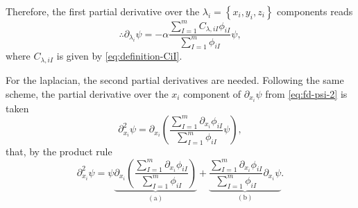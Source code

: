 Therefore, the first partial derivative over the 
$\lambda_i = \left\{ x_i, y_i, z_i \right\}$
components reads
\begin{equation} \label{eq:partial-psi-lambda}
    \therefore
    \partial_{\lambda_i} \psi 
    =
    -\alpha
    \frac{
        \sum_{I=1}^{m} 
        C_{\lambda,iI}
        \phi_{iI} 
    }{
        \sum_{I=1}^{m} \phi_{iI}
    }
    \psi
    ,
\end{equation}
where $C_{\lambda,iI}$ is given by \cref{eq:definition-CiI}.

For the laplacian, the second partial derivatives are needed.
Following the same scheme, the partial derivative over the $x_i$ component of
$\partial_{x_i} \psi$ from  \cref{eq:fd-psi-2} is taken 
\begin{equation}
    \partial_{x_i}^{2} \psi =
    \partial_{x_i}
    \left(
        \frac{
            \sum_{I=1}^{m} \partial_{x_i} \phi_{iI}
        }{
            \sum_{I=1}^{m} \phi_{iI}
        }
        \psi
    \right)
    ,
\end{equation}
that, by the product rule
\begin{equation} \label{eq:sd-psi-1}
    \partial_{x_i}^{2} \psi =
    \psi
    \underbrace{
        \partial_{x_i}
        \left( 
            \frac{
                \sum_{I=1}^{m} \partial_{x_i} \phi_{iI}
            }{
                \sum_{I=1}^{m} \phi_{iI}
            }
        \right)
    }_{\left( \mathrm{a} \right)}
    +
    \underbrace{
        \frac{
            \sum_{I=1}^{m} \partial_{x_i} \phi_{iI}
        }{
            \sum_{I=1}^{m} \phi_{iI}
        }
        \partial_{x_i}
        \psi
    }_{\left( \mathrm{b} \right)}
    .
\end{equation}

